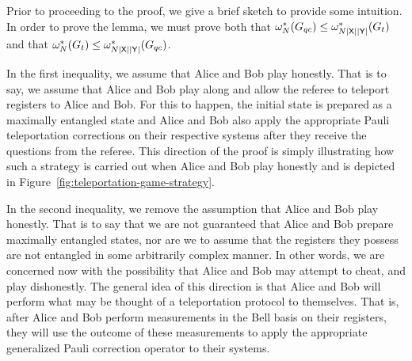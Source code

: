 Prior to proceeding to the proof, we give a brief sketch to provide some intuition. In order to prove the lemma, we must prove both that $\omega_N^*(G_{qc}) \leq \omega_{N \left\lvert \mathsf{X} \right\rvert \left\lvert \mathsf{Y} \right\rvert}^*(G_t)$ and that $\omega_{N}^*(G_t) \leq \omega_{N\left\lvert \mathsf{X} \right\rvert\left\lvert \mathsf{Y} \right\rvert}^*(G_{qc})$. 

In the first inequality, we assume that Alice and Bob play honestly. That is to say, we assume that Alice and Bob play along and allow the referee to teleport registers to Alice and Bob. For this to happen, the initial state is prepared as a maximally entangled state and Alice and Bob also apply the appropriate Pauli teleportation corrections on their respective systems after they receive the questions from the referee. This direction of the proof is simply illustrating how such a strategy is carried out when Alice and Bob play honestly and is depicted in Figure~\ref{fig:teleportation-game-strategy}. 

In the second inequality, we remove the assumption that Alice and Bob play honestly. That is to say that we are not guaranteed that Alice and Bob prepare maximally entangled states, nor are we to assume that the registers they possess are not entangled in some arbitrarily complex manner. In other words, we are concerned now with the possibility that Alice and Bob may attempt to cheat, and play dishonestly. The general idea of this direction is that Alice and Bob will perform what may be thought of a teleportation protocol to themselves. That is, after Alice and Bob perform measurements in the Bell basis on their registers, they will use the outcome of these measurements to apply the appropriate generalized Pauli correction operator to their systems. 

